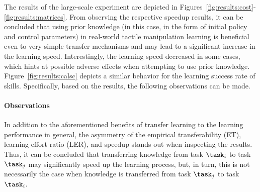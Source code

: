 The results of the large-scale \skillmodelabbr{} experiment are depicted in Figures~\ref{fig:results:cost}-\ref{fig:results:matrices}.
From observing the respective speedup results, it can be concluded that using prior knowledge (in this case, in the form of initial policy and control parameters) in real-world tactile manipulation learning is beneficial even to very simple transfer mechanisms and may lead to a significant increase in the learning speed.
Interestingly, the learning speed decreased in some cases, which hints at possible adverse effects when attempting to use prior knowledge.
Figure~\ref{fig:results:calsc} depicts a similar behavior for the learning success rate of skills. 
Specifically, based on the results, the following observations can be made.

\paragraph{Observations}

In addition to the aforementioned benefits of transfer learning to the learning performance in general, the asymmetry of the empirical transferability (ET), learning effort ratio (LER), and speedup stands out when inspecting the results.
Thus, it can be concluded that transferring knowledge from task $\task_i$ to task $\task_j$ may significantly speed up the learning process, but, in turn, this is not necessarily the case when knowledge is transferred from task $\task_j$ to task $\task_i$.

